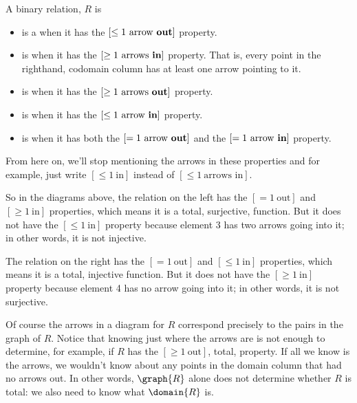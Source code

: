 \begin{definition}
A binary relation, $R$ is
\begin{itemize}

\item is a  when it has the $[\le 1\ \text{arrow
    \textbf{out}}]$ property.

\item is  when it has the $[\ge 1\ \text{arrows
    \textbf{in}}]$ property.  That is, every point in the righthand,
     codomain column has at least one arrow pointing to it.

\item is  when it has the $[\ge 1\ \text{arrows
       \textbf{out}}]$ property.

\item is  when it has the $[\le 1\ \text{arrow
    \textbf{in}}]$ property.

\item is  when it has both the $[=1\ \text{arrow
    \textbf{out}}]$ and the $[=1\ \text{arrow \textbf{in}}]$ property.
\end{itemize}
\end{definition}

From here on, we'll stop mentioning the arrows in these properties and for
example, just write $[\le 1\ \text{in}]$ instead of $[\le 1\ \text{arrows
  in}]$.

So in the diagrams above, the relation on the left has the $[=1\
\text{out}]$ and $[\ge 1\ \text{in}]$ properties, which means it is a
total, surjective, function.  But it does not have the $[\le 1\
\text{in}]$ property because element 3 has two arrows going into it; in
other words, it is not injective.

The relation on the right has the $[=1\ \text{out}]$ and $[\le
  1\ \text{in}]$ properties, which means it is a total, injective
function.  But it does not have the $[\ge 1\ \text{in}]$ property
because element 4 has no arrow going into it; in other words, it is
not surjective.

Of course the arrows in a diagram for $R$ correspond precisely to the
pairs in the graph of $R$.  Notice that knowing just where the arrows
are is not enough to determine, for example, if $R$ has the $[\ge
  1\ \text{out}]$, total, property.  If all we know is the arrows, we
wouldn't know about any points in the domain column that had no arrows
out.  In other words, $\graph{R}$ alone does not determine whether
$R$ is total: we also need to know what $\domain{R}$ is.

